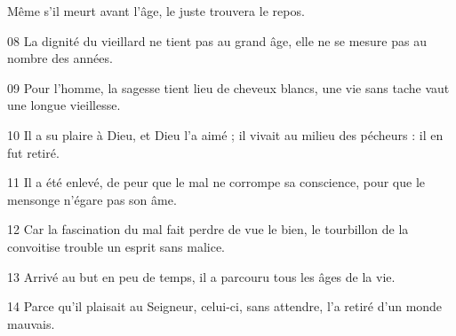 Même s’il meurt avant l’âge, le juste trouvera le repos.

08 La dignité du vieillard ne tient pas au grand âge, elle ne se mesure pas au nombre des années.

09 Pour l’homme, la sagesse tient lieu de cheveux blancs, une vie sans tache vaut une longue vieillesse.

10 Il a su plaire à Dieu, et Dieu l’a aimé ; il vivait au milieu des pécheurs : il en fut retiré.

11 Il a été enlevé, de peur que le mal ne corrompe sa conscience, pour que le mensonge n’égare pas son âme.

12 Car la fascination du mal fait perdre de vue le bien, le tourbillon de la convoitise trouble un esprit sans malice.

13 Arrivé au but en peu de temps, il a parcouru tous les âges de la vie.

14 Parce qu’il plaisait au Seigneur, celui-ci, sans attendre, l’a retiré d’un monde mauvais. 